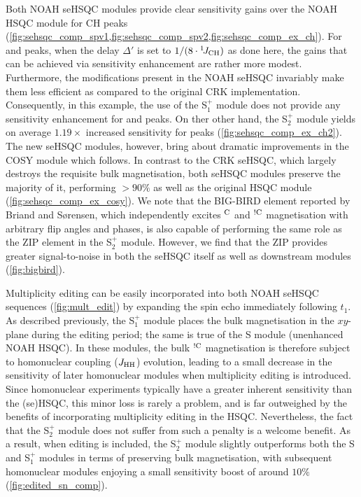 \documentclass[11pt]{article}
\newcommand*{\noahS}{S}
\newcommand*{\noahSpa}{S$^+_1$}
\newcommand*{\noahSpb}{S$^+_2$}
\newcommand*{\hl}[1]{\textcolor{WildStrawberry}{#1}}
\newcommand*{\onejch}{{}^{1}\!J_{\ce{CH}}}
\newcommand*{\magn}[1]{\ce{^1H}$^{#1}$}
\newcommand*{\magnnot}[1]{\ce{^1H}$^{!#1}$}
\newcommand*{\jhh}{J_{\ce{HH}}}
\begin{document}
\hl{
Both NOAH seHSQC modules provide clear sensitivity gains over the NOAH HSQC module for CH peaks (\cref{fig:sehsqc_comp_spv1,fig:sehsqc_comp_spv2,fig:sehsqc_comp_ex_ch}).
For \ce{CH2} and \ce{CH3} peaks, when the delay $\Delta'$ is set to $1/(8 \cdot \onejch)$ as done here, the gains that can be achieved via sensitivity enhancement are rather more modest.\autocite{Schleucher1994JBNMR}
Furthermore, the modifications present in the NOAH seHSQC invariably make them less efficient as compared to the original CRK implementation.
Consequently, in this example, the use of the \noahSpa{} module does not provide any sensitivity enhancement for \ce{CH2} and \ce{CH3} peaks.
On ther other hand, the \noahSpb{} module yields on average $1.19\times$ increased sensitivity for \ce{CH2} peaks (\cref{fig:sehsqc_comp_ex_ch2}).
The new seHSQC modules, however, bring about dramatic improvements in the COSY module which follows.
In contrast to the CRK seHSQC, which largely destroys the requisite bulk magnetisation, both seHSQC modules preserve the majority of it, performing $>90\%$ as well as the original HSQC module (\cref{fig:sehsqc_comp_ex_cosy}).
We note that the BIG-BIRD element reported by Briand and S{\o}rensen\autocite{Briand1997JMR}, which independently excites \magn{\ce{C}} and \magnnot{\ce{C}} magnetisation with arbitrary flip angles and phases, is also capable of performing the same role as the ZIP element in the \noahSpb{} module.
However, we find that the ZIP provides greater signal-to-noise in both the seHSQC itself as well as downstream modules (\cref{fig:bigbird}).
}

Multiplicity editing can be easily incorporated into both NOAH seHSQC sequences (\cref{fig:mult_edit}) by expanding the spin echo immediately following $t_1$.
\hl{
As described previously, the \noahSpa{} module places the bulk magnetisation in the $xy$-plane during the editing period; the same is true of the S module (unenhanced NOAH HSQC).
}
In these modules, the bulk \magnnot{\ce{C}} magnetisation is therefore subject to homonuclear coupling ($\jhh$) evolution, leading to a small decrease in the sensitivity of later homonuclear modules when multiplicity editing is introduced.
Since homonuclear experiments typically have a greater inherent sensitivity than the (se)HSQC, this minor loss is rarely a problem, and is far outweighed by the benefits of incorporating multiplicity editing in the HSQC.
Nevertheless, the fact that the \noahSpb{} module does not suffer from such a penalty is a welcome benefit.
\hl{
As a result, when editing is included, the \noahSpb{} module slightly outperforms both the \noahS{} and \noahSpa{} modules in terms of preserving bulk magnetisation, with subsequent homonuclear modules enjoying a small sensitivity boost of around $10\%$ (\cref{fig:edited_sn_comp}).
}
\end{document}
